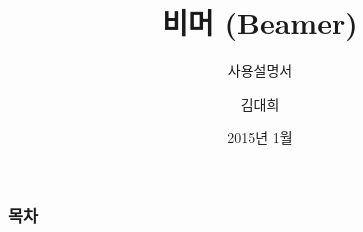 \documentclass[ aspectratio=169,  10pt,blue,xcolor=pdftex,dvipsnames,table,handout,notes]{beamer}
\begin{document}
	

			\title{비머 (Beamer)}
			\subtitle{사용설명서}
			\author{김대희}
			\date[2011.11.10]{2015년 1월}



		\begin{frame}[plain]
		\titlepage
		
		\end{frame}



		\begin{frame}[plain]
		\frametitle{목차}

		\tableofcontents


		\end{frame}
\end{document}
